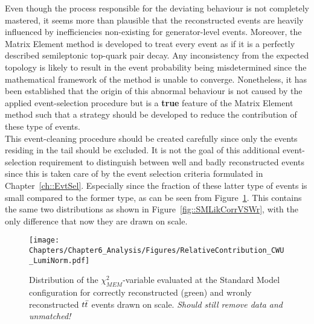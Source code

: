 
Even though the process responsible for the deviating behaviour is not completely mastered, it seems more than plausible that the reconstructed events are heavily influenced by inefficiencies non-existing for generator-level events. Moreover, the Matrix Element method is developed to treat every event as if it is a perfectly described semileptonic top-quark pair decay. Any inconsistency from the expected topology is likely to result in the event probability being misdetermined since the mathematical framework of the method is unable to converge.
Nonetheless, it has been established that the origin of this abnormal behaviour is not caused by the applied event-selection procedure but is a \textbf{true} feature of the Matrix Element method such that a strategy should be developed to reduce the contribution of these type of events.
\\

This event-cleaning procedure should be created carefully since only the events residing in the tail should be excluded. It is not the goal of this additional event-selection requirement to distinguish between well and badly reconstructed events since this is taken care of by the event selection criteria formulated in Chapter~\ref{ch::EvtSel}.
Especially since the fraction of these latter type of events is small compared to the former type, as can be seen from Figure~\ref{fig::SMLikCorrVSWrUnSc}. This contains the same two distributions as shown in Figure~\ref{fig::SMLikCorrVSWr}, with the only difference that now they are drawn on scale.
\\
\begin{figure}[h!t]
 \centering
 \texttt{[image: Chapters/Chapter6\_Analysis/Figures/RelativeContribution\_CWU\_LumiNorm.pdf]}
 \caption{Distribution of the $\chi^{2}_{MEM}$-variable evaluated at the Standard Model configuration for correctly reconstructed (green) and wronly reconstructed $t\bar{t}$ events drawn on scale. \textit{Should still remove data and unmatched!}} \label{fig::SMLikCorrVSWrUnSc}
\end{figure}

